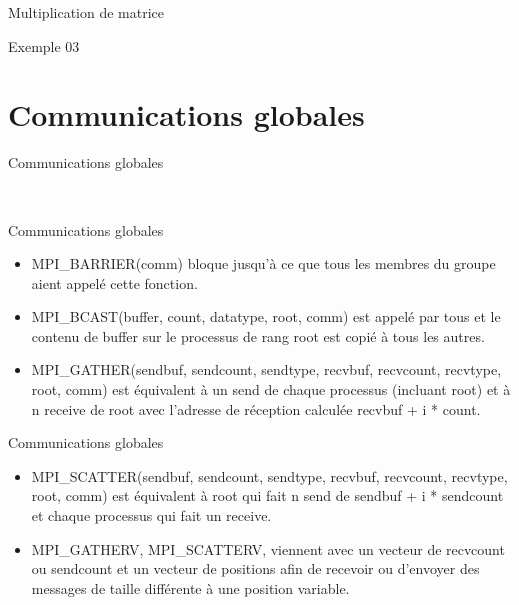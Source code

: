 \documentclass[10pt]{beamer}
\begin{document}
\begin{frame}[fragile]{Multiplication de matrice}

Exemple 03
\end{frame}

\section{Communications globales}

\begin{frame}[fragile]{Communications globales}

  \begin{center}
     \\
  \end{center}
\end{frame}

\begin{frame}{Communications globales}

  \begin{itemize}
    \item MPI\_BARRIER(comm) bloque jusqu'à ce que tous les membres du groupe aient appelé cette fonction.

    \item MPI\_BCAST(buffer, count, datatype, root, comm) est appelé par tous et le contenu de buffer sur le processus de rang root est copié à tous les autres.

    \item MPI\_GATHER(sendbuf, sendcount, sendtype, recvbuf, recvcount, recvtype, root, comm) est équivalent à un send de chaque processus (incluant root) et à n receive de root avec l'adresse de réception calculée recvbuf + i * count.
  \end{itemize}
\end{frame}

\begin{frame}{Communications globales}

  \begin{itemize}
    \item MPI\_SCATTER(sendbuf, sendcount, sendtype, recvbuf, recvcount, recvtype, root, comm) est équivalent à root qui fait n send de sendbuf + i * sendcount et chaque processus qui fait un receive.

    \item MPI\_GATHERV, MPI\_SCATTERV, viennent avec un vecteur de recvcount ou sendcount et un vecteur de positions afin de recevoir ou d'envoyer des messages de taille différente à une position variable.
  \end{itemize}
\end{frame}
\end{document}
